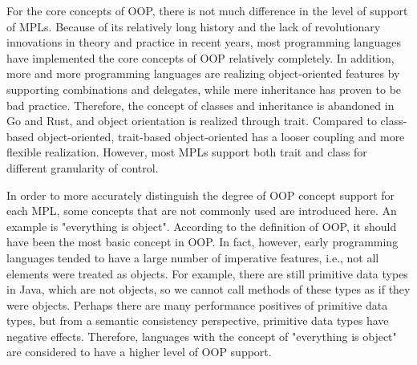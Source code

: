 For the core concepts of OOP, there is not much difference in the level of support of MPLs. Because of its relatively long history and the lack of revolutionary innovations in theory and practice in recent years, most programming languages have implemented the core concepts of OOP relatively completely. In addition, more and more programming languages are realizing object-oriented features by supporting combinations and delegates, while mere inheritance has proven to be bad practice. Therefore, the concept of classes and inheritance is abandoned in Go and Rust, and object orientation is realized through trait. Compared to class-based object-oriented, trait-based object-oriented has a looser coupling and more flexible realization. However, most MPLs support both trait and class for different granularity of control.

In order to more accurately distinguish the degree of OOP concept support for each MPL, some concepts that are not commonly used are introduced here. An example is "everything is object". According to the definition of OOP, it should have been the most basic concept in OOP. In fact, however, early programming languages tended to have a large number of imperative features, i.e., not all elements were treated as objects. For example, there are still primitive data types in Java, which are not objects, so we cannot call methods of these types as if they were objects. Perhaps there are many performance positives of primitive data types, but from a semantic consistency perspective, primitive data types have negative effects. Therefore, languages with the concept of "everything is object" are considered to have a higher level of OOP support.

